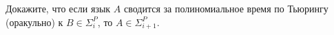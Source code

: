 Докажите, что если язык $A$ сводится за полиномиальное время по Тьюрингу (оракульно) к $B \in \Sigma_i^P$, то $A \in
\Sigma_{i + 1}^P$.